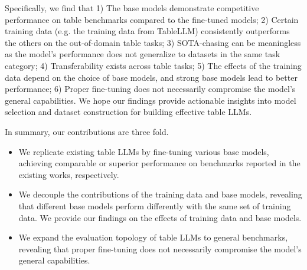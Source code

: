 \documentclass[11pt]{article}
\newcommand{\patricng}[1]{\textcolor{teal}{[PN: #1]}}
\begin{document}
Specifically, we find that 1) The base models demonstrate competitive performance on table benchmarks compared to the fine-tuned models; 
2) Certain training data (e.g. the training data from TableLLM) consistently outperforms the others on the out-of-domain table tasks;
3) SOTA-chasing can be meaningless as the model's performance does not generalize to datasets in the same task category;
4) Transferability exists across table tasks;
5) The effects of the training data depend on the choice of base models, and strong base models lead to better performance;
6) Proper fine-tuning does not necessarily compromise the model's general capabilities.
We hope our findings provide actionable insights into model selection and dataset construction for building effective table LLMs.

\noindent In summary, our contributions are three fold.

\begin{itemize}[leftmargin=0.4cm,itemsep=0.1cm]
    \item We replicate existing table LLMs by fine-tuning various base models, achieving comparable or superior performance on benchmarks reported in the existing works, respectively.
    \item We decouple the contributions of the training data and base models, revealing that different base models perform differently with the same set of training data.
    We provide our findings on the effects of training data and base models.
    \item We expand the evaluation topology of table LLMs to general benchmarks, revealing that proper fine-tuning does not necessarily compromise the model's general capabilities.
\end{itemize}
\end{document}

